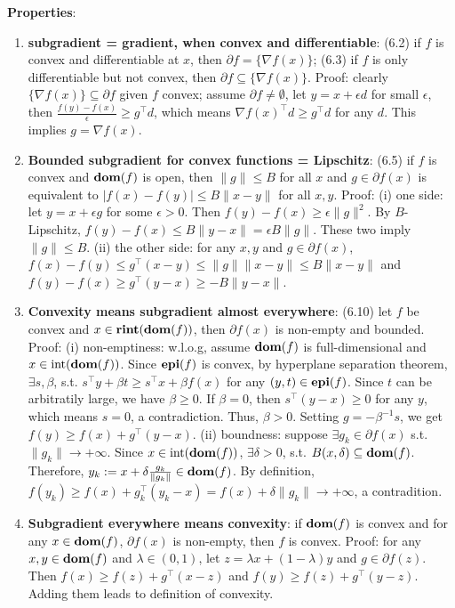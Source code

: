 \textbf{Properties}:
\begin{enumerate}
    \item \textbf{subgradient = gradient, when convex and differentiable}: (6.2) if $f$ is convex and differentiable at $x$, then $\partial f=\{\nabla f(x)\}$; (6.3) if $f$ is only differentiable but not convex, then $\partial f \subseteq \{\nabla f(x)\}$. Proof: clearly $\{\nabla f(x)\} \subseteq \partial f$ given $f$ convex; assume $\partial f \ne \emptyset$, let $y = x+\epsilon d$ for small $\epsilon$, then $\frac{f(y) - f(x)}{\epsilon} \ge g^\top d$, which means $\nabla f(x)^\top d \ge g^\top d$ for any $d$. This implies $g = \nabla f(x)$.
    \item \textbf{Bounded subgradient for convex functions = Lipschitz}: (6.5) if $f$ is convex and $\operatorname{\textbf{dom}}(f)$ is open, then $\|g\| \le B$ for all $x$ and $g \in \partial f(x)$ is equivalent to $|f(x)-f(y)| \le B \|x-y\|$ for all $x,y$. Proof: (i) one side: let $y=x+\epsilon g$ for some $\epsilon >0$. Then $f(y)-f(x) \ge \epsilon \|g\|^2$. By $B$-Lipschitz, $f(y) -f(x) \le B\|y-x\| = \epsilon B \|g\|$. These two imply $\|g\|\le B$. (ii) the other side: for any $x,y$ and $g \in \partial f(x)$, $f(x) - f(y) \le g^\top (x-y) \le \|g\|\|x-y\| \le B\|x-y\|$ and $f(y) - f(x) \ge g^\top (y-x) \ge -B \|y-x\|$.
    \item \textbf{Convexity means subgradient almost everywhere}: (6.10) let $f$ be convex and $x \in \operatorname{\textbf{rint}}(\operatorname{\textbf{dom}}(f))$, then $\partial f(x)$ is non-empty and bounded. Proof: (i) non-emptiness: w.l.o.g, assume $\operatorname{\textbf{dom}}(f)$ is full-dimensional and $x \in \text{int}(\operatorname{\textbf{dom}}(f))$. Since $\operatorname{\textbf{epi}}(f)$ is convex, by hyperplane separation theorem, $\exists s, \beta$, s.t. $s^\top y + \beta t \ge s^\top x + \beta f(x)$ for any $(y,t) \in \operatorname{\textbf{epi}}(f)$. Since $t$ can be arbitratily large, we have $\beta \ge 0$. If $\beta = 0$, then $s^\top (y-x) \ge 0$ for any $y$, which means $s=0$, a contradiction. Thus, $\beta > 0$. Setting $g = -\beta^{-1} s$, we get $f(y) \ge f(x) + g^\top (y-x)$. (ii) boundness: suppose $\exists g_k \in \partial f(x)$ s.t. $\|g_k\| \rightarrow +\infty$. Since $x\in\text{int}(\operatorname{\textbf{dom}}(f))$, $\exists \delta>0$, s.t. $B(x, \delta) \subseteq \operatorname{\textbf{dom}}(f)$. Therefore, $y_k := x+\delta \frac{g_k}{\|g_k\|} \in \operatorname{\textbf{dom}}(f)$. By definition, $f(y_k) \ge f(x) + g_k^\top (y_k - x) = f(x) + \delta \|g_k\| \rightarrow +\infty$, a contradition.
    \item \textbf{Subgradient everywhere means convexity}: if $\operatorname{\textbf{dom}}(f)$ is convex and for any $x \in \operatorname{\textbf{dom}}(f)$, $\partial f(x)$ is non-empty, then $f$ is convex. Proof: for any $x, y \in \operatorname{\textbf{dom}}(f)$ and $\lambda \in (0,1)$, let $z = \lambda x + (1-\lambda) y$ and $g \in \partial f(z)$. Then $f(x) \ge f(z) + g^\top (x-z)$ and $f(y) \ge f(z) + g^\top (y-z)$. Adding them leads to definition of convexity.

\end{enumerate}
